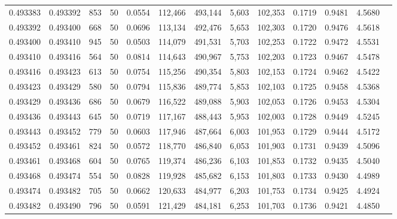 \begin{tabular}{rrrrrrrrrrrrr}
0.493383 & 0.493392 &   853 &  50 &                                     0.0554 & 112,466 & 493,144 &   5,603 & 102,353 & 0.1719 & 0.9481 & 4.5680 \\
0.493392 & 0.493400 &   668 &  50 &                                     0.0696 & 113,134 & 492,476 &   5,653 & 102,303 & 0.1720 & 0.9476 & 4.5618 \\
0.493400 & 0.493410 &   945 &  50 &                                     0.0503 & 114,079 & 491,531 &   5,703 & 102,253 & 0.1722 & 0.9472 & 4.5531 \\
0.493410 & 0.493416 &   564 &  50 &                                     0.0814 & 114,643 & 490,967 &   5,753 & 102,203 & 0.1723 & 0.9467 & 4.5478 \\
0.493416 & 0.493423 &   613 &  50 &                                     0.0754 & 115,256 & 490,354 &   5,803 & 102,153 & 0.1724 & 0.9462 & 4.5422 \\
0.493423 & 0.493429 &   580 &  50 &                                     0.0794 & 115,836 & 489,774 &   5,853 & 102,103 & 0.1725 & 0.9458 & 4.5368 \\
0.493429 & 0.493436 &   686 &  50 &                                     0.0679 & 116,522 & 489,088 &   5,903 & 102,053 & 0.1726 & 0.9453 & 4.5304 \\
0.493436 & 0.493443 &   645 &  50 &                                     0.0719 & 117,167 & 488,443 &   5,953 & 102,003 & 0.1728 & 0.9449 & 4.5245 \\
0.493443 & 0.493452 &   779 &  50 &                                     0.0603 & 117,946 & 487,664 &   6,003 & 101,953 & 0.1729 & 0.9444 & 4.5172 \\
0.493452 & 0.493461 &   824 &  50 &                                     0.0572 & 118,770 & 486,840 &   6,053 & 101,903 & 0.1731 & 0.9439 & 4.5096 \\
0.493461 & 0.493468 &   604 &  50 &                                     0.0765 & 119,374 & 486,236 &   6,103 & 101,853 & 0.1732 & 0.9435 & 4.5040 \\
0.493468 & 0.493474 &   554 &  50 &                                     0.0828 & 119,928 & 485,682 &   6,153 & 101,803 & 0.1733 & 0.9430 & 4.4989 \\
0.493474 & 0.493482 &   705 &  50 &                                     0.0662 & 120,633 & 484,977 &   6,203 & 101,753 & 0.1734 & 0.9425 & 4.4924 \\
0.493482 & 0.493490 &   796 &  50 &                                     0.0591 & 121,429 & 484,181 &   6,253 & 101,703 & 0.1736 & 0.9421 & 4.4850 \\

\end{tabular}
